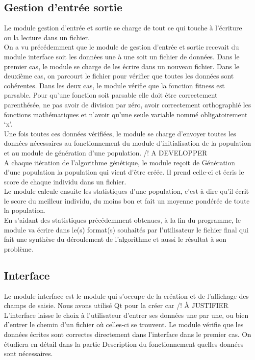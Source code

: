 \documentclass[a4paper,11pt]{article}
\begin{document}
		\subsection{Gestion d'entrée sortie}
			Le module gestion d’entrée et sortie se charge de tout ce qui touche à l’écriture ou la lecture dans un fichier.\\
			On a vu précédemment que le module de gestion d’entrée et sortie recevait du module interface soit les données une à une soit un fichier de données.
			Dans le premier cas, le module se charge de les écrire dans un nouveau fichier.
			Dans le deuxième cas, on parcourt le fichier pour vérifier que toutes les données sont cohérentes. Dans les deux cas, le module vérifie que la fonction fitness est parsable.
			Pour qu’une fonction soit parsable elle doit être correctement parenthésée, ne pas avoir de division par zéro, avoir correctement orthographié les fonctions mathématiques et n’avoir qu’une seule variable nommé obligatoirement ‘x’.\\
			Une fois toutes ces données vérifiées, le module se charge d’envoyer toutes les données nécessaires au fonctionnement du module d’initialisation de la population et au module de génération d’une population. /! A DEVELOPPER\\
			A chaque itération de l’algorithme génétique, le module reçoit de Génération d’une population la population qui vient d’être créée.
			Il prend celle-ci et écris le score de chaque individu dans un fichier.\\
			Le module calcule ensuite les statistiques d’une population, c’est-à-dire qu’il écrit le score du meilleur individu, du moins bon et fait un moyenne pondérée de toute la population.\\
			En s’aidant des statistiques précédemment obtenues, à la fin du programme, le module va écrire dans le(s) format(s) souhaités par l’utilisateur le fichier final qui fait une synthèse du déroulement de l’algorithme et aussi le résultat à son problème.
		
		\subsection{Interface}
			Le module interface est le module qui s’occupe de la création et de l’affichage des champs de saisie. Nous avons utilisé Qt pour la créer car /! À JUSTIFIER\\	
			L’interface laisse le choix à l’utilisateur d’entrer ses données une par une, ou bien d’entrer le chemin  d’un fichier où celles-ci se trouvent.
			Le module vérifie que les données écrites sont correctes directement dans l’interface dans le premier cas.
			On étudiera en détail dans la partie Description du fonctionnement quelles données sont nécessaires.\\
\end{document}

